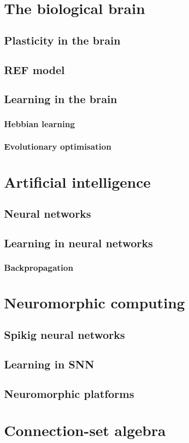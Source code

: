 \documentclass[report.tex]{subfiles}
\begin{document}
\section{The biological brain}
\subsection{Plasticity in the brain}
\subsection{REF model}

\subsection{Learning in the brain}
\subsubsection{Hebbian learning}
\subsubsection{Evolutionary optimisation}

\section{Artificial intelligence}
\subsection{Neural networks} \label{sec:NN}
\subsection{Learning in neural networks}
\subsubsection{Backpropagation}

\section{Neuromorphic computing}
\subsection{Spikig neural networks} \label{sec:SNN}
\subsection{Learning in SNN}
\subsection{Neuromorphic platforms}

\section{Connection-set algebra} \label{sec:CSA}
\end{document}
